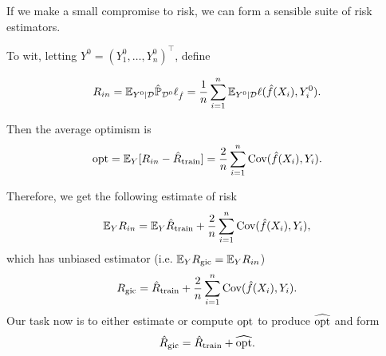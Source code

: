 \documentclass[11pt]{article}
\begin{document}
\begin{enumerate}
  If we make a small compromise to risk, we can form a sensible suite of risk
  estimators.

  To wit, letting $Y^0 = (Y_1^0,\ldots,Y_n^0)^{\top}$, define

  \[
  R_{in} = \mathbb{E}_{Y^0 | \mathcal{D}} \hat{\mathbb{P}}_{\mathcal{D}^0} \ell_{\hat{f}}= \frac{1}{n}
  \sum_{i=1}^n \mathbb{E}_{Y^0 | \mathcal{D}} \ell(\hat{f}(X_i),Y_i^0).
  \]


  Then the average optimism is
  \[
  \textrm{opt} = \mathbb{E}_Y [ R_{in} - \hat{R}_{\textrm{train}}]= \frac{2}{n} \sum_{i=1}^n \textrm{Cov}(\hat
  f(X_i),Y_i).
  \]


  Therefore, we get the following estimate of risk
  \[
  \mathbb{E}_Y R_{in} = \mathbb{E}_Y \hat{R}_{\textrm{train}} + \frac{2}{n} \sum_{i=1}^n \textrm{Cov}(\hat
  f(X_i),Y_i),
  \]
  which has unbiased estimator (i.e. $\mathbb{E}_Y R_{\textrm{gic}} = \mathbb{E}_Y R_{in}$)
  \[
  R_{\textrm{gic}} = \hat{R}_{\textrm{train}} + \frac{2}{n} \sum_{i=1}^n \textrm{Cov}(\hat f(X_i),Y_i).
  \]
  Our task now is to either estimate or compute $\textrm{opt}$ to produce $\widehat{\textrm{opt}}$ and
  form
  \begin{equation}
    \hat{R}_{\textrm{gic}} = \hat{R}_{\textrm{train}} + \widehat{\textrm{opt}}.
    \label{eq:gic}
  \end{equation}
  

\end{enumerate}
\end{document}
